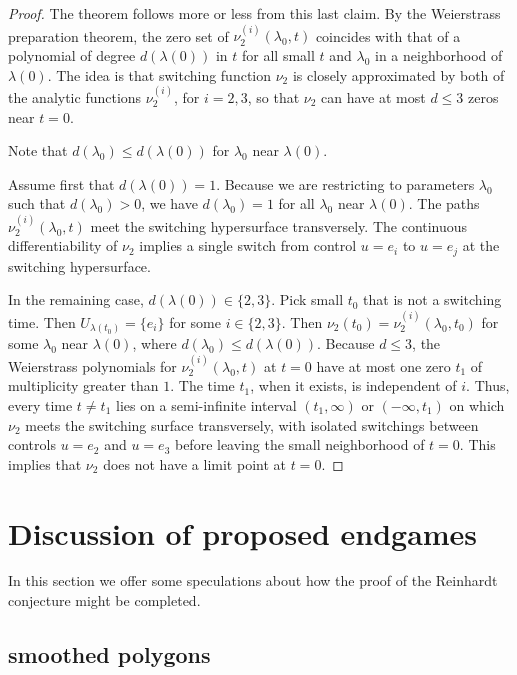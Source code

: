 \documentclass{article}
\theoremstyle{remark}
\begin{document}
\begin{proof}
The theorem follows more or less from this last claim.  By the
Weierstrass preparation theorem, the zero set of
$\nu_2^{(i)}(\lambda_0,t)$ coincides with that of a polynomial of
degree $d(\lambda(0))$ in $t$ for all small $t$ and $\lambda_0$ in a
neighborhood of $\lambda(0)$. The idea is that switching function
$\nu_2$ is closely approximated by both of the analytic functions
$\nu_2^{(i)}$, for $i=2,3$, so that $\nu_2$ can have at most $d\le 3$
zeros near $t=0$.

Note that $d(\lambda_0)\le d(\lambda(0))$ for
$\lambda_0$ near $\lambda(0)$.  

Assume first that $d(\lambda(0))=1$.  Because we are restricting to
parameters $\lambda_0$ such that $d(\lambda_0)>0$, we have
$d(\lambda_0)=1$ for all $\lambda_0$ near $\lambda(0)$.  The
paths $\nu_2^{(i)}(\lambda_0,t)$ meet the switching
hypersurface transversely.  The continuous differentiability of $\nu_2$
implies a single switch from control $u=e_i$ to $u=e_j$ at the
switching hypersurface.

In the remaining case, $d(\lambda(0))\in\{ 2,3\}$.  Pick small $t_0$
that is not a switching time.  Then $U_{\lambda(t_0)}=\{e_i\}$ for some
$i\in\{2,3\}$.  Then $\nu_2(t_0) = \nu^{(i)}_2(\lambda_0,t_0)$ for some
$\lambda_0$ near $\lambda(0)$, where $d(\lambda_0)\le d(\lambda(0))$.
Because $d\le 3$, the Weierstrass polynomials for
$\nu^{(i)}_2(\lambda_0,t)$ at $t=0$ have at most one zero $t_1$ of
multiplicity greater than $1$.  The time $t_1$, when it exists,
is independent of $i$.  Thus, every time $t\ne t_1$ lies on a
semi-infinite interval $(t_1,\infty)$ or $(-\infty,t_1)$ on which
$\nu_2$ meets the switching surface transversely, with isolated
switchings between controls $u=e_2$ and $u=e_3$ before leaving the
small neighborhood of  $t=0$.  This implies that $\nu_2$ does not
have a limit point at  $t=0$.
\end{proof}



\section{Discussion of proposed endgames}

In this section we offer some speculations about how the proof of the
Reinhardt conjecture might be completed.

\subsection{smoothed polygons}
\end{document}
